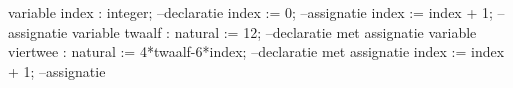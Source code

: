 variable index : integer;                   --declaratie
index := 0;                                 --assignatie
index := index + 1;                         --assignatie
variable twaalf : natural := 12;            --declaratie met assignatie
variable viertwee : natural := 4*twaalf-6*index;  --declaratie met assignatie
index := index + 1;                               --assignatie
